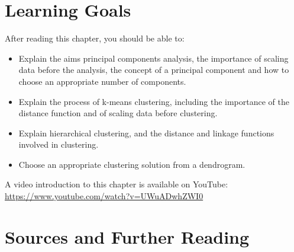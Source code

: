 %
%
\section*{Learning Goals}

After reading this chapter, you should be able to:
\begin{itemize}
   \item Explain the aims principal components analysis, the importance of scaling data before the analysis, the concept of a principal component and how to choose an appropriate number of components.
   \item Explain the process of k-means clustering, including the importance of the distance function and of scaling data before clustering.
   \item Explain hierarchical clustering, and the distance and linkage functions involved in clustering.
   \item Choose an appropriate clustering solution from a dendrogram.
\end{itemize}

\begin{advanced}
\begin{videobox}
A video introduction to this chapter is available on YouTube:\\

\url{https://www.youtube.com/watch?v=UWuADwhZWI0}
\end{videobox}
\end{advanced}

\section*{Sources and Further Reading}

